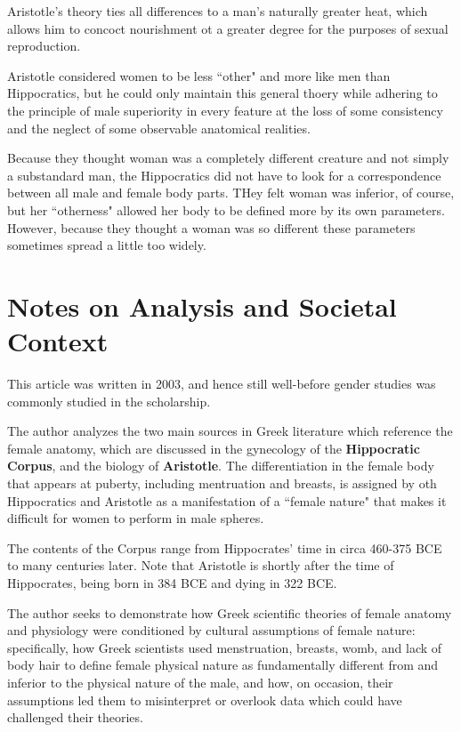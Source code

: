 Aristotle's theory ties all differences to a man's naturally greater heat, which allows him to concoct nourishment ot a greater degree for the purposes of sexual reproduction.

\begin{rmk}
    Aristotle considered women to be less ``other" and more like men than Hippocratics, but he could only maintain this general thoery while adhering to the principle of male superiority in every feature at the loss of some consistency and the neglect of some observable anatomical realities.
\end{rmk}

\begin{rmk}
    Because they thought woman was a completely different creature and not simply a substandard man, the Hippocratics did not have to look for a correspondence between all male and female body parts. THey felt woman was inferior, of course, but her ``otherness" allowed her body to be defined more by its own parameters. However, because they thought a woman was so different these parameters sometimes spread a little too widely.
\end{rmk}






\section{Notes on Analysis and Societal Context}
\label{sec:SocCont5}

This article was written in 2003, and hence still well-before gender studies was commonly studied in the scholarship.

\begin{nte}
    The author analyzes the two main sources in Greek literature which reference the female anatomy, which are discussed in the gynecology of the \textbf{Hippocratic Corpus}, and the biology of \textbf{Aristotle}. The differentiation in the female body that appears at puberty, including mentruation and breasts, is assigned by oth Hippocratics and Aristotle as a manifestation of a ``female nature" that makes it difficult for women to perform in male spheres.
\end{nte}


The contents of the Corpus range from Hippocrates' time in circa 460-375 BCE to many centuries later. Note that Aristotle is shortly after the time of Hippocrates, being born in 384 BCE and dying in 322 BCE.


\begin{rmk}
    The author seeks to demonstrate how Greek scientific theories of female anatomy and physiology were conditioned by cultural assumptions of female nature: specifically, how Greek scientists used menstruation, breasts, womb, and lack of body hair to define female physical nature as fundamentally different from and inferior to the physical nature of the male, and how, on occasion, their assumptions led them to misinterpret or overlook data which could have challenged their theories.
\end{rmk}

